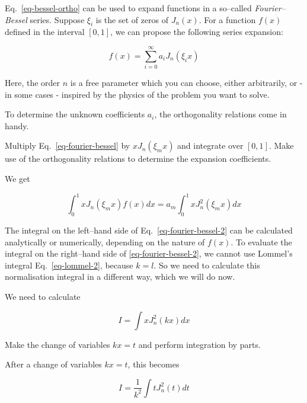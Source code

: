 \noindent{}Eq.~\ref{eq-bessel-ortho} can be used to expand functions in a so--called \emph{Fourier--Bessel} series. Suppose $\xi_i$ is the set of zeros of $J_n(x)$. For a function $f(x)$ defined in the interval $[0,1]$, we can propose the following series expansion:

\begin{equation}
f(x) = \sum_{i=0}^{\infty} a_i J_n(\xi_i x) \label{eq-fourier-bessel}
\end{equation} 

Here, the order $n$ is a free parameter which you can choose, either arbitrarily, or - in some cases - inspired by the physics of the problem you want to solve.

To determine the unknown coefficients $a_i$, the orthogonality relations come in handy.

\begin{cue}
Multiply Eq.~\ref{eq-fourier-bessel} by $x J_n(\xi_m x)$ and integrate over $[0,1]$. Make use of the orthogonality relations to determine the expansion coefficients.  
\end{cue}

We get

\begin{equation}
\int_0^1 x J_n(\xi_m x) f(x) dx = a_m \int_0^1 x J_n^2(\xi_m x) dx \label{eq-fourier-bessel-2}
\end{equation} 

The integral on the left--hand side of Eq.~\ref{eq-fourier-bessel-2} can be calculated analytically or numerically, depending on the nature of $f(x)$. To evaluate the integral on the right--hand side of \ref{eq-fourier-bessel-2}, we cannot use Lommel's integral Eq.~\ref{eq-lommel-2}, because $k=l$. So we need to calculate this normalisation integral in a different way, which we will do now.

We need to calculate

\begin{equation}
I = \int x J_n^2(k x) dx
\end{equation}

\begin{cue}
Make the change of variables $kx = t$ and perform integration by parts.
\end{cue}

After a change of variables $kx = t$, this becomes

\begin{equation}
I = \frac{1}{k^2} \int t J_n^2(t) dt
\end{equation}

